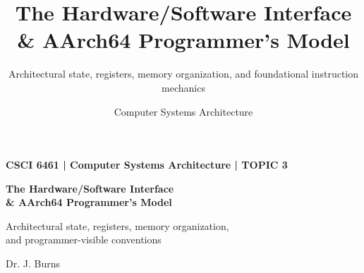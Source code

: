 \documentclass[aspectratio=169,11pt,t,xcolor=table]{beamer}
\title[Topic 3]{
  The Hardware/Software Interface\\
  \& AArch64 Programmer's Model
}
\subtitle{
  Architectural state, registers, memory organization,
  and foundational instruction mechanics
}
\author{
  Computer Systems Architecture
}
\date{}
\begin{document}

\begin{frame}[plain]


\vspace*{\fill}

\begin{minipage}{0.88\textwidth}

{\color{gold}\normalsize\bfseries
CSCI 6461 \;|\; Computer Systems Architecture \;|\; TOPIC 3
\par}

\vspace{0.25cm}

{\color{white}\fontsize{24}{28}\selectfont\bfseries
The Hardware/Software Interface\\[0.08cm]\& AArch64 Programmer's Model
\par}

\vspace{0.35cm}

{\color{white!80}\large
Architectural state, registers, memory organization,\\and programmer-visible conventions
\par}

\end{minipage}

\vfill

{\color{white!70}\small
Dr. J. Burns
\par}

\vspace*{\fill}

\end{frame}










\end{document}
